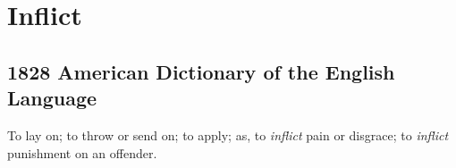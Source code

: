 \section{Inflict}
	\label{INFLICT}
	

\subsection{1828 American Dictionary of the English Language} %
	\label{INFLICT-1828}

	\begin{compactitem}
		\item To lay on; to throw or send on; to apply; as, to \textit{inflict} pain or disgrace; to \textit{inflict} punishment on an offender.
	\end{compactitem}




	
	
